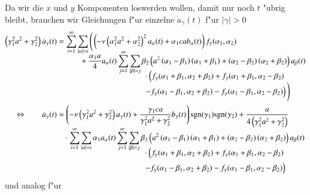 Da wir die $x$ und $y$ Komponenten loswerden wollen, damit nur noch $t$ "ubrig 
bleibt, brauchen wir Gleichungen f"ur einzelne $\dot{a}_\gamma(t)$ f"ur 
$|\gamma| > 0$
\begin{align}
\left(\gamma_1^2 a^2 + \gamma_2^2\right)
\dot{a}_\gamma(t)
&=
\sum_{i = 1}^{\infty}
\sum_{|\alpha| = i}
\Bigg(
\left(
-\nu
\left(\alpha_1^2 a^2+\alpha_2^2\right)^2
a_{\alpha}(t)
+
\alpha_1 c a
b_{\alpha}(t)
\right)
f_\gamma(\alpha_1, \alpha_2) \nonumber
\\[-2ex]
&\phantom{=aaaa{}}
+
\frac{\alpha_1 a}{4}
a_{\alpha}(t)
\sum_{j = 1}^{\infty}
\sum_{|\beta| = j}
\beta_2
\left(
a^2 \left(\alpha_1 - \beta_1 \right)\left(\alpha_1 + \beta_1 \right)
+ \left(\alpha_2 - \beta_2 \right)\left(\alpha_2 + \beta_2 \right)
\right)
a_{\beta}(t) \nonumber
\\[-2ex]
&\phantom{=-4aapaata..\sum\sum.....{}a.}
\cdot
\left(
f_\gamma(\alpha_1 + \beta_1, \alpha_2 + \beta_2)
+
f_\gamma(\alpha_1 + \beta_1, \alpha_2 - \beta_2)
\right. \nonumber
\\[-1ex]
&\phantom{=-4aapaata..\sum\sum.....{}a.}
\left.
-
f_\gamma(\alpha_1 - \beta_1, \alpha_2 + \beta_2)
-
f_\gamma(\alpha_1 - \beta_1, \alpha_2 - \beta_2)
\right)
\Bigg) \nonumber
\\
\Leftrightarrow \qquad
\dot{a}_\gamma(t)
&=
\left(
-\nu
\left(\gamma_1^2 a^2+\gamma_2^2\right)
a_{\gamma}(t)
+
\frac{\gamma_1 ca}{\gamma_1^2 a^2 + \gamma_2^2}
b_{\gamma}(t)
\right)
\sgn(\gamma_1)\sgn(\gamma_2)
+
\frac{a}{4 \left(\gamma_1^2 a^2 + \gamma_2^2\right)}
\nonumber
\\[-1ex]
&\phantom{={}}
\cdot
\sum_{i = 1}^{\infty}
\sum_{|\alpha| = i}
\alpha_1
a_{\alpha}(t) \nonumber
\sum_{j = 1}^{\infty}
\sum_{|\beta| = j}
\beta_2
\left(
a^2 \left(\alpha_1 - \beta_1 \right)\left(\alpha_1 + \beta_1 \right)
+ \left(\alpha_2 - \beta_2 \right)\left(\alpha_2 + \beta_2 \right)
\right)
a_{\beta}(t) \nonumber
\\[-2ex]
&\phantom{=a.-4aapaata...a\sum\sum{}}
\cdot
\left(
f_\gamma(\alpha_1 + \beta_1, \alpha_2 + \beta_2)
+
f_\gamma(\alpha_1 + \beta_1, \alpha_2 - \beta_2)
\right. \nonumber
\\
&\phantom{=a.-4aapaata...a\sum\sum{}}
\left.
-
f_\gamma(\alpha_1 - \beta_1, \alpha_2 + \beta_2)
-
f_\gamma(\alpha_1 - \beta_1, \alpha_2 - \beta_2)
\right)
\label{equation:lorenz2:dota}
\end{align}
und analog f"ur
